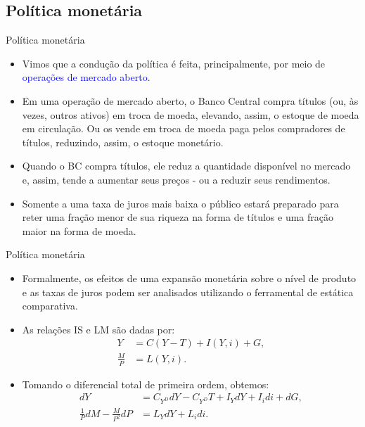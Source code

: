 \documentclass[10pt]{beamer}
\begin{document}
\subsection{Política monetária}
\begin{frame}{Política monetária}
    \begin{itemize}
        \item Vimos que a condução da política é feita, principalmente, por meio de \textcolor{blue}{operações de mercado aberto}.
        \bigskip
        \item Em uma operação de mercado aberto, o Banco Central compra títulos (ou, às vezes, outros ativos) em troca de moeda, elevando, assim, o estoque de moeda em circulação. Ou os vende em troca de moeda paga pelos compradores de títulos, reduzindo, assim, o estoque monetário.
        \bigskip
        \item Quando o BC compra títulos, ele reduz a quantidade disponível no mercado e, assim, tende a aumentar seus preços - ou a reduzir seus rendimentos.
        \bigskip
        \item Somente a uma taxa de juros mais baixa o público estará preparado para reter uma fração menor de sua riqueza na forma de títulos e uma fração maior na forma de moeda.
    \end{itemize}
\end{frame}

\begin{frame}{Política monetária}
\begin{itemize}
    \item Formalmente, os efeitos de uma expansão monetária sobre o nível de produto e as taxas de juros podem ser analisados utilizando o ferramental de estática comparativa.
    \bigskip
    \item As relações IS e LM são dadas por:
    \begin{align}
    Y &= C(Y-T) + I(Y,i) + G, \tag{IS} \\
    \frac{M}{P} &= L(Y,i). \tag{LM}
    \end{align}
    \bigskip
    \item Tomando o diferencial total de primeira ordem, obtemos:
    \begin{align}
        dY &= C_{Y^D} dY - C_{Y^D}T + I_YdY + I_idi + dG, \tag{IS'} \\
        \frac{1}{P}dM - \frac{M}{P^2}dP &= L_YdY + L_idi. \tag{LM'}
    \end{align}
\end{itemize}
\end{frame}
\end{document}
